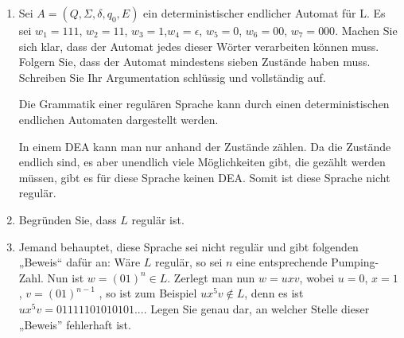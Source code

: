 \documentclass{lehramt-informatik-aufgabe}
\begin{document}
\begin{enumerate}


\item Sei $A = (Q, \Sigma, \delta, q_0 , E)$ ein deterministischer
endlicher Automat für L. Es sei $w_1 = 111$, $w_2 = 11$, $w_3 = 1$,$ w_4
= \epsilon$, $w_5 = 0$, $w_6 = 00$, $w_7 = 000$. Machen Sie sich klar,
dass der Automat jedes dieser Wörter verarbeiten können muss. Folgern
Sie, dass der Automat mindestens sieben Zustände haben muss. Schreiben
Sie Ihr Argumentation schlüssig und vollständig auf.

\begin{liAntwort}

Die Grammatik einer regulären Sprache kann durch einen deterministischen
endlichen Automaten dargestellt werden.

In einem DEA kann man nur anhand der Zustände zählen. Da die Zustände
endlich sind, es aber unendlich viele Möglichkeiten gibt, die gezählt
werden müssen, gibt es für diese Sprache keinen DEA. Somit ist diese
Sprache nicht regulär.
\end{liAntwort}


\item Begründen Sie, dass $L$ regulär ist.

\begin{liAntwort}
\begin{center}
\end{center}
\end{liAntwort}


\item Jemand behauptet, diese Sprache sei nicht regulär und gibt
folgenden „Beweis“ dafür an: Wäre $L$ regulär, so sei $n$ eine
entsprechende Pumping-Zahl. Nun ist $w = (01)^n \in L$. Zerlegt man nun
$w = uxv$, wobei $u = 0$, $x = 1$, $v = (01)^{n-1}$ , so ist zum Beispiel
$ux^5 v \notin L$, denn es ist $ux^5 v = 01111101010101$.... Legen Sie
genau dar, an welcher Stelle dieser „Beweis” fehlerhaft ist.


\end{enumerate}
\end{document}
